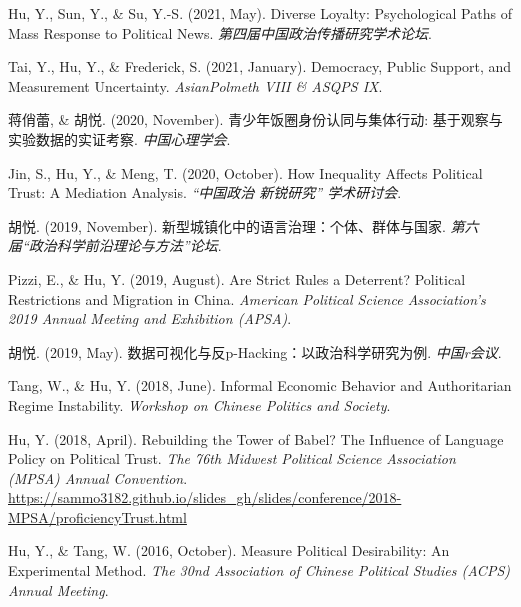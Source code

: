 \documentclass[11pt,a4paper,]{awesome-cv}
\begin{document}
\leavevmode{}%
Hu, Y., Sun, Y., \& Su, Y.-S. (2021, May). Diverse Loyalty:
Psychological Paths of Mass Response to Political News.
\emph{第四届中国政治传播研究学术论坛}.

\leavevmode{}%
Tai, Y., Hu, Y., \& Frederick, S. (2021, January). Democracy, Public
Support, and Measurement Uncertainty. \emph{AsianPolmeth VIII \& ASQPS
IX}.

\leavevmode{}%
蒋俏蕾, \& 胡悦. (2020, November). 青少年饭圈身份认同与集体行动:
基于观察与实验数据的实证考察. \emph{中国心理学会}.

\leavevmode{}%
Jin, S., Hu, Y., \& Meng, T. (2020, October). How Inequality Affects
Political Trust: A Mediation Analysis. \emph{{``中国政治 新锐研究''}
学术研讨会}.

\leavevmode{}%
胡悦. (2019, November). 新型城镇化中的语言治理：个体、群体与国家.
\emph{第六届``政治科学前沿理论与方法''论坛}.

\leavevmode{}%
Pizzi, E., \& Hu, Y. (2019, August). Are Strict Rules a Deterrent?
Political Restrictions and Migration in China. \emph{American Political
Science Association's 2019 Annual Meeting and Exhibition (APSA)}.

\leavevmode{}%
胡悦. (2019, May). 数据可视化与反p-Hacking：以政治科学研究为例.
\emph{中国r会议}.

\leavevmode{}%
Tang, W., \& Hu, Y. (2018, June). Informal Economic Behavior and
Authoritarian Regime Instability. \emph{Workshop on Chinese Politics and
Society}.

\leavevmode{}%
Hu, Y. (2018, April). Rebuilding the Tower of Babel? The Influence of
Language Policy on Political Trust. \emph{The 76th Midwest Political
Science Association (MPSA) Annual Convention}.
\url{https://sammo3182.github.io/slides_gh/slides/conference/2018-MPSA/proficiencyTrust.html}

\leavevmode{}%
Hu, Y., \& Tang, W. (2016, October). Measure Political Desirability: An
Experimental Method. \emph{The 30nd Association of Chinese Political
Studies (ACPS) Annual Meeting}.

\endgroup
\end{document}

